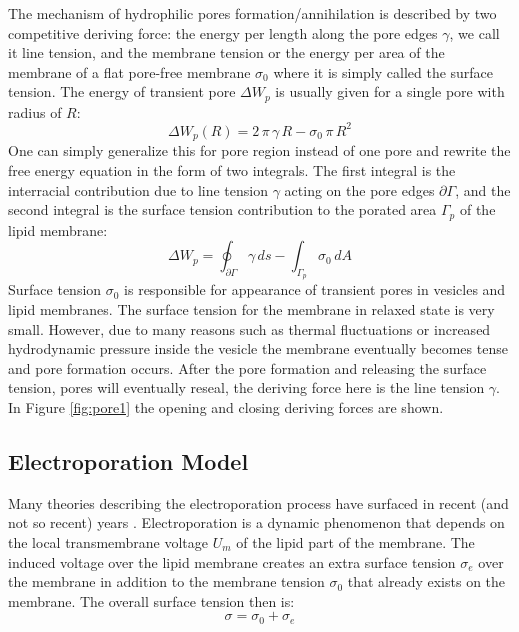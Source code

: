 \documentclass[english,12pt]{article}
\begin{document}
The mechanism of hydrophilic pores formation/annihilation is described by two competitive deriving force: the energy per length along the pore edges $\gamma$, we call it line tension, and the membrane tension or the energy per area of the membrane of a flat pore-free membrane $\sigma_0$ where it is simply called the surface tension. The energy of transient pore $\Delta W_{p}$ is usually given for a single pore with radius of $R$:
\begin{equation}
	\Delta W_{p}(R)=2\,\pi\,\gamma\,R-\sigma_0\,\pi\,R^2
\end{equation}
One can simply generalize this for pore region instead of one pore and rewrite the free energy equation in the form of two integrals. The first integral is the interracial contribution due to line tension $\gamma$ acting on the pore edges $\partial\Gamma$, and the second integral is the surface tension contribution to the porated area $\Gamma_p$ of the lipid membrane:
\begin{equation}
	\Delta W_{p} = \oint_{\partial\Gamma}\gamma\,ds - \int_{\Gamma_p}\sigma_0\,dA
	\label{eqn:transientmodel}
\end{equation}
Surface tension $\sigma_0$ is responsible for appearance of transient pores in vesicles and lipid membranes. The surface tension for the membrane in relaxed state is very small. However, due to many reasons such as thermal fluctuations or increased hydrodynamic pressure inside the vesicle the membrane eventually becomes tense and pore formation occurs. After the pore formation and releasing the surface tension, pores will eventually reseal, the deriving force here is the line tension $\gamma$. In Figure \ref{fig:pore1} the opening and closing deriving forces are shown.


\subsection{Electroporation Model}
Many theories describing the electroporation process have surfaced in recent (and not so recent) years \citep{Weaver1996135,Zimmermann1974881,DeBruin19991213}. Electroporation is a dynamic phenomenon that depends on the local transmembrane voltage $U_{m}$ of the lipid part of the membrane. The induced voltage over the lipid membrane creates an extra surface tension $\sigma_{e}$ over the membrane in addition to the membrane tension $\sigma_0$ that already exists on the membrane. The overall surface tension then is:
\begin{equation}
\sigma=\sigma_0+\sigma_e
\end{equation}
\end{document}

